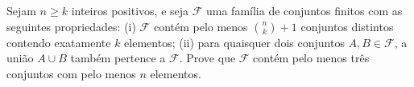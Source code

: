 Sejam \(n \ge k\) inteiros positivos, e seja \(\mathcal{F}\) uma família de conjuntos finitos com as seguintes propriedades:
(i) \(\mathcal{F}\) contém pelo menos \(\binom{n}{k}+1\) conjuntos distintos contendo exatamente \(k\) elementos;
(ii) para quaisquer dois conjuntos \(A, B \in \mathcal{F}\), a união \(A \cup B\) também pertence a \(\mathcal{F}\).
Prove que \(\mathcal{F}\) contém pelo menos três conjuntos com pelo menos \(n\) elementos.
